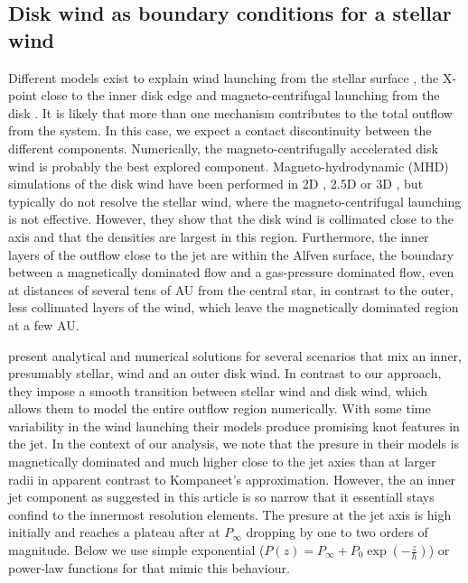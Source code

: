 \subsection{Disk wind as boundary conditions for a stellar wind}
Different models exist to explain wind launching from the stellar surface \citep{1988ApJ...332L..41K,2005ApJ...632L.135M}, the X-point close to the inner disk edge \citep{1994ApJ...429..781S} and magneto-centrifugal launching from the disk \citep{1982MNRAS.199..883B,2005ApJ...630..945A}. It is likely that more than one mechanism contributes to the total outflow from the system. In this case, we expect a contact discontinuity between the different components. Numerically, the magneto-centrifugally accelerated disk wind is probably the best explored component. Magneto-hydrodynamic (MHD) simulations of the disk wind have been performed in 2D \citep{2005ApJ...630..945A}, 2.5D \citep{2011ApJ...728L..11R} or 3D \citep{2006ApJ...653L..33A}, but typically do not resolve the stellar wind, where the magneto-centrifugal launching is not effective. However, they show that the disk wind is collimated close to the axis and that the densities are largest in this region. Furthermore, the inner layers of the outflow close to the jet are within the Alfven surface, the boundary between a magnetically dominated flow and a gas-pressure dominated flow, even at distances of several tens of AU from the central star, in contrast to the outer, less collimated layers of the wind, which leave the magnetically dominated region at a few AU.

\citet{2009A&amp;A...502..217M} present analytical and numerical solutions for several scenarios that mix an inner, presumably stellar, wind and an outer disk wind. In contrast to our approach, they impose a smooth transition between stellar wind and disk wind, which allows them to model the entire outflow region numerically. With some time variability in the wind launching their models produce promising knot features in the jet. In the context of our analysis, we note that the presure in their models is magnetically dominated and much higher close to the jet axies than at larger radii in apparent contrast to Kompaneet's approximation. However, the an inner jet component as suggested in this article is so narrow that it essentiall stays confind to the innermost resolution elements. The presure at the jet axis is high initially and reaches a plateau after at $P_\infty$ dropping by one to two orders of magnitude. Below we use simple exponential ($P(z)=P_\infty+P_0\exp\left(-\frac{z}{h}\right)$) or power-law functions for that mimic this behaviour.

